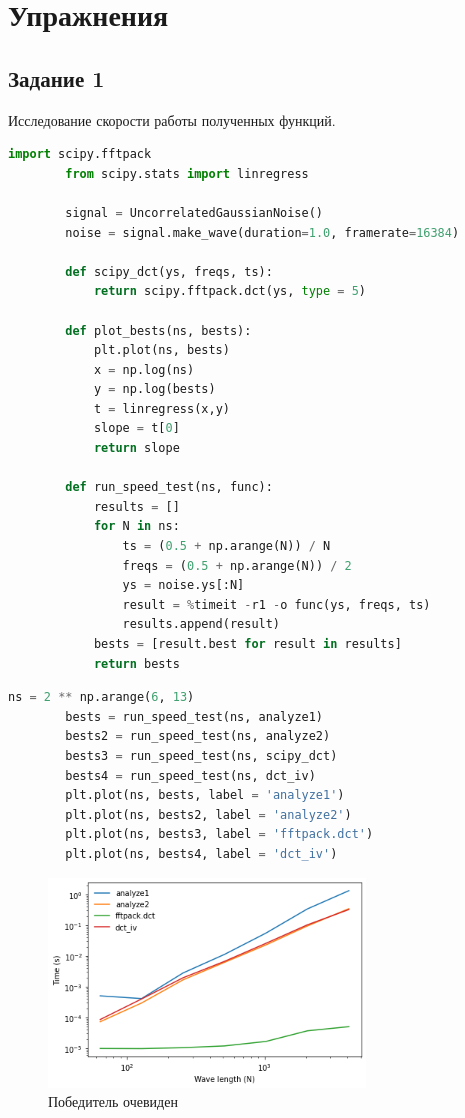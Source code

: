 \documentclass[a4paper, 12pt]{report}
\begin{document}
	\chapter{Упражнения}
	\section{Задание 1}
	Исследование скорости работы полученных функций.
	\begin{lstlisting}[language=Python,caption=Подготовка к исследованию]
		import scipy.fftpack		
		from scipy.stats import linregress

		signal = UncorrelatedGaussianNoise()
		noise = signal.make_wave(duration=1.0, framerate=16384)

		def scipy_dct(ys, freqs, ts): 
			return scipy.fftpack.dct(ys, type = 5)		

		def plot_bests(ns, bests):    
			plt.plot(ns, bests)
			x = np.log(ns)
			y = np.log(bests)
			t = linregress(x,y)
			slope = t[0]
			return slope

		def run_speed_test(ns, func):
			results = []
			for N in ns:
				ts = (0.5 + np.arange(N)) / N
				freqs = (0.5 + np.arange(N)) / 2
				ys = noise.ys[:N]
				result = %timeit -r1 -o func(ys, freqs, ts)
				results.append(result)    
			bests = [result.best for result in results]
			return bests
	\end{lstlisting}
	\begin{lstlisting}[language=Python,caption=Кто быстрее?]
		ns = 2 ** np.arange(6, 13)
		bests = run_speed_test(ns, analyze1)
		bests2 = run_speed_test(ns, analyze2)
		bests3 = run_speed_test(ns, scipy_dct)
		bests4 = run_speed_test(ns, dct_iv)
		plt.plot(ns, bests, label = 'analyze1')
		plt.plot(ns, bests2, label = 'analyze2')
		plt.plot(ns, bests3, label = 'fftpack.dct')
		plt.plot(ns, bests4, label = 'dct_iv')
	\end{lstlisting}
	\begin{figure}[H]
		\centering
		\includegraphics[width=0.75\textwidth]{dct3.png}
		\caption{Победитель очевиден}
		\label{fig:dct3}
	\end{figure}
	
\end{document}
